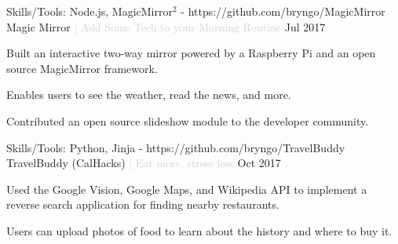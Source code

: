

\begin{cventries}

  \cventry
  {Skills/Tools: Node.js, MagicMirror$^2$ - https://github.com/bryngo/MagicMirror} %
  {Magic Mirror \textcolor{lightgray}{| Add Some Tech to your Morning Routine}} %
  {} %
  {Jul 2017} %
  {
  \begin{cvitems} %
    \item {Built an interactive two-way mirror powered by a Raspberry Pi and an open source MagicMirror framework.}
    \item {Enables users to see the weather, read the news, and more.}
    \item {Contributed an open source slideshow module to the developer community.}
  \end{cvitems}
  }

  \cventry
  {Skills/Tools: Python, Jinja - https://github.com/bryngo/TravelBuddy} %
  {TravelBuddy (CalHacks) \textcolor{lightgray}{| Eat more, stress less}} %
  {} %
  {Oct 2017} %
  {
  \begin{cvitems} %
    \item {Used the Google Vision, Google Maps, and Wikipedia API to implement a reverse search application for finding nearby restaurants.}
    \item {Users can upload photos of food to learn about the history and where to buy it.}
  \end{cvitems}
  }



\end{cventries}
